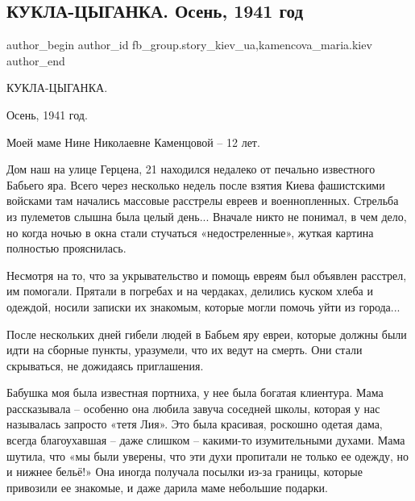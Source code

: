  
 
 
 
 
 
\subsection{КУКЛА-ЦЫГАНКА. Осень, 1941 год}
\label{sec:12_01_2021.fb.fb_group.story_kiev_ua.1.kukla_cyganka_1941}
 
\ifcmt
 author_begin
   author_id fb_group.story_kiev_ua,kamencova_maria.kiev
 author_end
\fi

КУКЛА-ЦЫГАНКА.

Осень, 1941 год. 

Моей маме Нине Николаевне Каменцовой – 12 лет.

Дом наш на улице Герцена, 21 находился недалеко от печально известного Бабьего
яра. Всего через несколько недель после взятия Киева фашистскими войсками там
начались массовые расстрелы евреев и военнопленных. Стрельба из пулеметов
слышна была целый день... Вначале никто не понимал, в чем дело, но когда ночью в
окна стали стучаться «недостреленные», жуткая картина полностью прояснилась.

Несмотря на то, что за укрывательство и помощь евреям был объявлен расстрел, им
помогали. Прятали в погребах и на чердаках, делились куском хлеба и одеждой,
носили записки их знакомым, которые могли помочь уйти из города...


После нескольких дней гибели людей в Бабьем яру евреи, которые должны были идти
на сборные пункты, уразумели, что их ведут на смерть. Они стали скрываться, не
дожидаясь приглашения.

Бабушка моя была известная портниха, у нее была богатая клиентура. Мама
рассказывала – особенно она любила завуча соседней школы, которая у нас
называлась запросто «тетя Лия». Это была красивая, роскошно одетая дама, всегда
благоухавшая – даже слишком – какими-то изумительными духами. Мама шутила, что
«мы были уверены, что эти духи пропитали не только ее одежду, но и нижнее
бельё!» Она иногда получала посылки из-за границы, которые привозили ее
знакомые, и даже дарила маме небольшие подарки.

